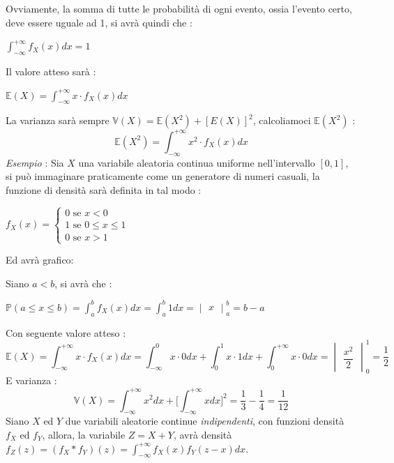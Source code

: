 \documentclass[12pt, letterpaper]{article}
\newcommand{\E}{{\mathbb E}}
\newcommand{\V}{{\mathbb V}}
\newcommand{\acc}{\\\hphantom{}\\}
\newcommand{\Prob}{{\mathbb P}}
\begin{document}
Ovviamente, la somma di tutte le probabilità di ogni evento, ossia l'evento certo, deve essere uguale 
ad 1, si avrà quindi che :\begin{center}
    \(\displaystyle\int_{-\infty}^{+\infty}f_X(x)dx=1\)
\end{center}
Il valore atteso sarà : \begin{center}
    \(\E(X)=\displaystyle\int_{-\infty}^{+\infty}x\cdot f_X(x)dx\)
\end{center}
La varianza sarà sempre \(\V(X)=\E(X^2)+[E(X)]^2\), calcoliamoci \(\E(X^2)\) : \begin{equation}
    \E(X^2)=\displaystyle\int_{-\infty}^{+\infty}x^2\cdot f_X(x)dx
\end{equation}
\textit{Esempio} : Sia \(X\) una variabile aleatoria continua uniforme nell'intervallo \([0,1]\), si può 
immaginare praticamente come un generatore di numeri casuali, la funzione di densità sarà 
definita in tal modo : \begin{center}
    \(f_X(x)=\begin{cases}
        0 \text{ se }x<0\\
        1 \text{ se }0\le x\le 1\\
        0 \text{ se }x>1
        \end{cases}\)
\end{center}
Ed avrà grafico:\\
\begin{figure}[h]
\end{figure}

Siano \(a<b\), si avrà che : \begin{center}
    \(\Prob(a\le x\le b)=\displaystyle\int_a^bf_X(x)dx=\displaystyle\int_a^b1dx=\begin{vmatrix}
        x
    \end{vmatrix}_a^b=b-a\)
\end{center}
Con seguente valore atteso : \begin{equation}
    \E(X)=\displaystyle\int_{-\infty}^{+\infty}x\cdot f_X(x)dx=
    \displaystyle\int_{-\infty}^{0}x\cdot 0dx+
    \displaystyle\int_{0}^{1}x\cdot 1dx+
    \displaystyle\int_{0}^{+\infty}x\cdot 0dx=\begin{vmatrix}
        \dfrac{x^2}{2}
    \end{vmatrix}_0^1=\dfrac{1}{2}
\end{equation}
E varianza : \begin{equation}
    \V(X)=\int_{-\infty}^{+\infty}x^2dx+\Big[ \int_{-\infty}^{+\infty}xdx \Big]^2=\dfrac{1}{3}-\dfrac{1}{4}=\dfrac{1}{12}
\end{equation}
Siano \(X\) ed \(Y\) due variabili aleatorie continue \textit{indipendenti}, con 
funzioni densità \(f_X\) ed \(f_Y\), allora, la variabile \(Z=X+Y\), avrà densità \(f_Z(z)=(f_X\ast f_Y)(z)=
\displaystyle\int_{-\infty}^{+\infty}f_X(x)f_Y(z-x)dx\).\acc 
\end{document}
